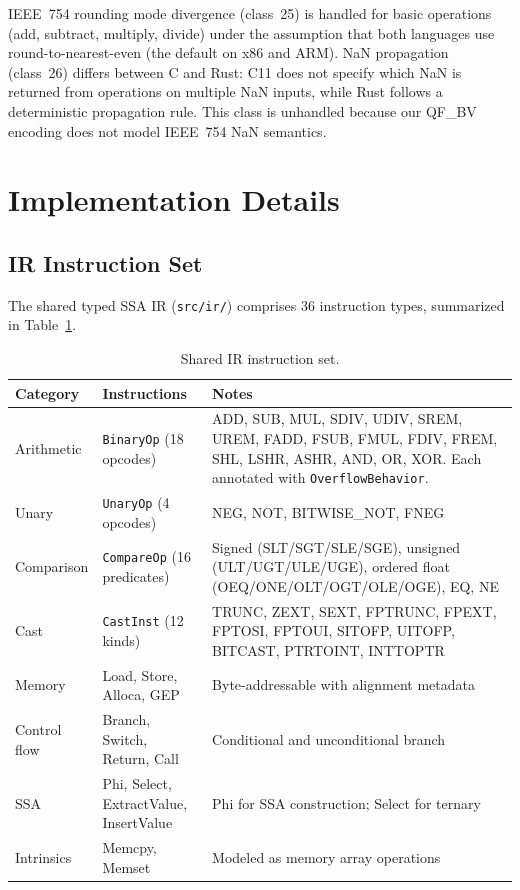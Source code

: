 \documentclass[10pt,a4paper]{article}
\begin{document}
\begin{appendices}
IEEE~754 rounding mode divergence (class~25) is handled for basic
operations (add, subtract, multiply, divide) under the assumption
that both languages use round-to-nearest-even (the default on x86
and ARM).  NaN propagation (class~26) differs between C and Rust:
C11 does not specify which NaN is returned from operations on
multiple NaN inputs, while Rust follows a deterministic propagation
rule.  This class is unhandled because our QF\_BV encoding does not
model IEEE~754 NaN semantics.


\section{Implementation Details}\label{app:impl-details}

\subsection{IR Instruction Set}

The shared typed SSA IR (\texttt{src/ir/}) comprises 36 instruction
types, summarized in Table~\ref{tab:ir-instructions}.

\begin{table}[h!]
\centering
\small
\caption{Shared IR instruction set.}
\label{tab:ir-instructions}
\begin{tabular}{@{}llp{6cm}@{}}
\toprule
Category & Instructions & Notes \\
\midrule
Arithmetic & \texttt{BinaryOp} (18 opcodes) &
  ADD, SUB, MUL, SDIV, UDIV, SREM, UREM,
  FADD, FSUB, FMUL, FDIV, FREM, SHL, LSHR,
  ASHR, AND, OR, XOR.
  Each annotated with \texttt{OverflowBehavior}. \\
Unary & \texttt{UnaryOp} (4 opcodes) &
  NEG, NOT, BITWISE\_NOT, FNEG \\
Comparison & \texttt{CompareOp} (16 predicates) &
  Signed (SLT/SGT/SLE/SGE), unsigned
  (ULT/UGT/ULE/UGE), ordered float
  (OEQ/ONE/OLT/OGT/OLE/OGE),
  EQ, NE \\
Cast & \texttt{CastInst} (12 kinds) &
  TRUNC, ZEXT, SEXT, FPTRUNC, FPEXT,
  FPTOSI, FPTOUI, SITOFP, UITOFP, BITCAST,
  PTRTOINT, INTTOPTR \\
Memory & Load, Store, Alloca, GEP &
  Byte-addressable with alignment metadata \\
Control flow & Branch, Switch, Return, Call &
  Conditional and unconditional branch \\
SSA & Phi, Select, ExtractValue, InsertValue &
  Phi for SSA construction; Select for ternary \\
Intrinsics & Memcpy, Memset &
  Modeled as memory array operations \\
\bottomrule
\end{tabular}
\end{table}


\end{appendices}
\end{document}
